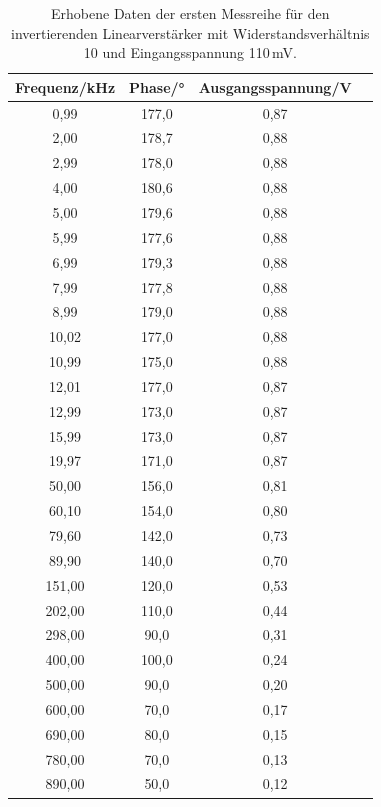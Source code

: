                 \begin{table}
                    \centering
                    \caption{Erhobene Daten der ersten Messreihe für den invertierenden Linearverstärker
                    mit Widerstandsverhältnis 10 und Eingangsspannung 110\,mV.}
                    \label{tab:inv2}
                    \begin{tabular}{c c c c}
                        \toprule
                            Frequenz/kHz &  Phase/°& Ausgangsspannung/V \\
                        \midrule
                             0,99 & 177,0 & 0,87\\
                             2,00 & 178,7 & 0,88\\ 
                             2,99 & 178,0 & 0,88\\ 
                             4,00 & 180,6 & 0,88\\
                             5,00 & 179,6 & 0,88\\
                             5,99 & 177,6 & 0,88\\
                             6,99 & 179,3 & 0,88\\
                             7,99 & 177,8 & 0,88\\
                             8,99 & 179,0 & 0,88\\
                            10,02 & 177,0 & 0,88\\
                            10,99 & 175,0 & 0,88\\
                            12,01 & 177,0 & 0,87\\
                            12,99 & 173,0 & 0,87\\
                            15,99 & 173,0 & 0,87\\
                            19,97 & 171,0 & 0,87\\
                            50,00 & 156,0 & 0,81\\
                            60,10 & 154,0 & 0,80\\
                            79,60 & 142,0 & 0,73\\
                            89,90 & 140,0 & 0,70\\
                           151,00 & 120,0 & 0,53\\
                           202,00 & 110,0 & 0,44\\
                           298,00 &  90,0 & 0,31\\
                           400,00 & 100,0 & 0,24\\
                           500,00 &  90,0 & 0,20\\
                           600,00 &  70,0 & 0,17\\
                           690,00 &  80,0 & 0,15\\
                           780,00 &  70,0 & 0,13\\
                           890,00 &  50,0 & 0,12\\
                        \bottomrule
                    \end{tabular}
                \end{table}    

